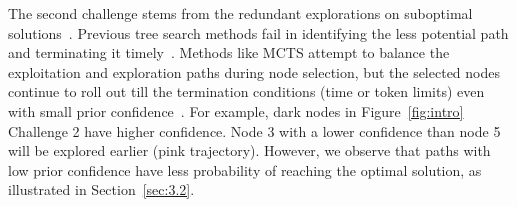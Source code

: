 The second challenge stems from the redundant explorations on suboptimal solutions~\cite{li2024escape, besta2024topologies}. Previous tree search methods fail in identifying the less potential path and terminating it timely~\cite{wan2024dynamic}. Methods like MCTS attempt to balance the exploitation and exploration paths during node selection, but the selected nodes continue to roll out till the termination conditions (time or token limits) even with small prior confidence~\cite{xie2024monte}. For example, dark nodes in Figure~\ref{fig:intro} Challenge 2 have higher confidence. Node 3 with a lower confidence than node 5 will be explored earlier (pink trajectory). 
However, we observe that paths with low prior confidence have less probability of reaching the optimal solution, as illustrated in Section~\ref{sec:3.2}. 



